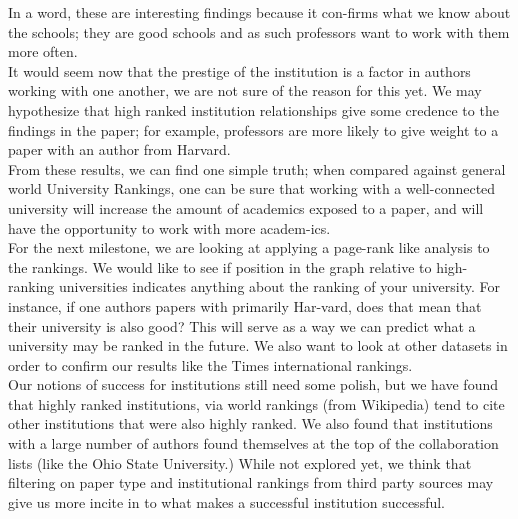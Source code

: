 \documentclass[times, 10pt,twocolumn]{article}
\begin{document}
In a word, these are interesting findings because it con-firms what we know about the schools; they are good schools and as such professors want to work with them more often. \\
It would seem now that the prestige of the institution is a factor in authors working with one another, we are not sure of the reason for this yet. We may hypothesize that high ranked institution relationships give some credence to the findings in the paper; for example, professors are more likely to give weight to a paper with an author from Harvard.\\
From these results, we can find one simple truth; when compared against general world University Rankings, one can be sure that working with a well-connected university will increase the amount of academics exposed to a paper, and will have the opportunity to work with more academ-ics. \\
For the next milestone, we are looking at applying a page-rank like analysis to the rankings. We would like to see if position in the graph relative to high-ranking universities indicates anything about the ranking of your university. For instance, if one authors papers with primarily Har-vard, does that mean that their university is also good? This will serve as a way we can predict what a university may be ranked in the future. We also want to look at other datasets in order to confirm our results like the Times international rankings. \\
Our notions of success for institutions still need some polish, but we have found that highly ranked institutions, via world rankings (from Wikipedia) tend to cite other institutions that were also highly ranked. We also found that institutions with a large number of authors found themselves at the top of the collaboration lists (like the Ohio State University.) While not explored yet, we think that filtering on paper type and institutional rankings from third party sources may give us more incite in to what makes a successful institution successful.
\end{document}
